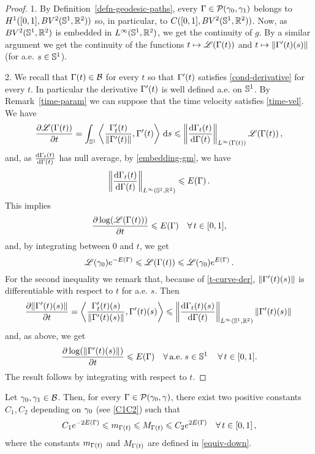 \begin{proof}
1. By Definition~\ref{defn-geodesic-paths}, every $\Gamma\in \mathcal{P}(\gamma_0,\gamma_1)$ belongs  to $H^1([0,1],BV^2(\mathbb{S}^1,\mathbb{R}^2))$ so, in particular, to $C([0,1],BV^2(\mathbb{S}^1,\mathbb{R}^2))$. Now, as $BV^2(\mathbb{S}^1,\mathbb{R}^2)$ is embedded in $L^\infty(\mathbb{S}^1,\mathbb{R}^2)$, we get the continuity of $g$. By a similar argument we get the continuity of the   functions $t\mapsto \mathscr{L}(\Gamma(t))$ and $t\mapsto \|\Gamma'(t)(s)\|$ (for a.e. $s\in \mathbb{S}^1$).





 
\medskip
2. We recall that $\Gamma(t)\in \mathcal{B}$ for every $t$ so that $\Gamma'(t)$ satisfies \eqref{cond-derivative} for every $t$. In particular the derivative $\Gamma'(t)$ is well defined a.e. on $\mathbb{S}^1$. By Remark~\ref{time-param} we can suppose that the time velocity satisfies \eqref{time-vel}. We have 
$$\frac{\partial \mathscr{L}(\Gamma(t))}{\partial t} = 
\int_{\mathbb{S}^1} \left\langle\frac{\Gamma_t'(t)}{\|\Gamma'(t)\|}, \Gamma'(t)\right\rangle\, \mathrm{d} s
\leqslant\left\|\frac{\mathrm{d} \Gamma_t(t)}{\mathrm{d} \Gamma(t)}\right\|_{L^\infty(\Gamma(t))}\mathscr{L}(\Gamma(t))\,,$$
and, as $\frac{\mathrm{d} \Gamma_t(t)}{\mathrm{d} \Gamma(t)}$ has null average, by \eqref{embedding-gm}, we have 
$$\left\|\frac{\mathrm{d} \Gamma_t(t)}{\mathrm{d} \Gamma(t)}\right\|_{L^\infty(\mathbb{S}^1,\mathbb{R}^2)}\leqslant E(\Gamma)\,.$$
This implies
$$ \frac{\partial \log( \mathscr{L}(\Gamma(t)))}{\partial t}\leqslant E(\Gamma) \quad \forall \, t\in [0,1],$$
and, by integrating between $0$ and $t$, we get 
$$\mathscr{L}(\gamma_0)e^{ -E(\Gamma)} \leqslant \mathscr{L}(\Gamma(t)) \leqslant \mathscr{L}(\gamma_0)e^{ E(\Gamma)}\,. $$ 
For the second inequality we remark that, because of \eqref{t-curve-der}, $\|\Gamma'(t)(s)\|$ is differentiable with respect to $t$ for a.e. $s$. Then   $$\frac{\partial \|\Gamma'(t)(s)\|}{\partial t} = \left\langle\frac{\Gamma_t'(t)(s)}{\|\Gamma'(t)(s)\|}, \Gamma'(t)(s) \right\rangle \leqslant\left\|\frac{\mathrm{d} \Gamma_t(t)(s)}{\mathrm{d} \Gamma(t)}\right\|_{L^\infty(\mathbb{S}^1,\mathbb{R}^2)}\|\Gamma'(t)(s)\|\,$$and, as above, we get  $$ \frac{\partial \log( \|\Gamma'(t)(s)\|)}{\partial t}\leqslant E(\Gamma) \quad 	\forall\,\mbox{a.e.}\; s\in \mathbb{S}^1\,\quad  \forall \, t\in [0,1].$$The result follows by integrating with respect to $t$. 
\end{proof}



\begin{prop}\label{global_bound_Mm} 
Let $\gamma_0,\gamma_1\in \mathcal{B}$. Then, for every  $\Gamma\in \mathcal{P}(\gamma_0,\gamma)$, there exist  two positive constants $C_1,C_2$  depending on $\gamma_0$  (see \eqref{C1C2}) such that
\begin{equation}\label{constantsMm}
C_1e^{-2E(\Gamma)}\leqslant m_{\Gamma(t)}\leqslant  M_{\Gamma(t)}\leqslant C_2e^{2E(\Gamma)} \quad \forall \, t \in [0,1]\,,
\end{equation}
where  the constants $m_{\Gamma(t)}$ and $M_{\Gamma(t)}$ are defined in \eqref{equiv-down}.

\end{prop}

